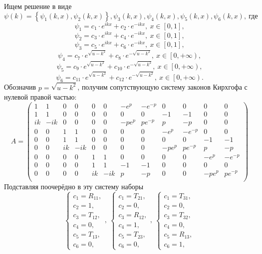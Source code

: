 \documentclass[a4 paper, 12 pt]{extarticle}
\begin{document}
   Ищем решение в виде
   \[\psi\left(k\right) = \left\{\psi_1\left(k,x\right), \psi_2\left(k,x\right)\right\}, \psi_3\left(k,x\right),\psi_4\left(k,x\right),\psi_5\left(k,x\right),\psi_6\left(k,x\right),\ \text{где}\]
   \[\psi_1 = c_1 \cdot e^{ikx} + c_2 \cdot e^{-ikx}, \ x \in \left[0,1\right],\]
   \[\psi_2 = c_3 \cdot e^{ikx} + c_4 \cdot e^{-ikx}, \ x \in \left[0,1\right],\]
   \[\psi_3 = c_5 \cdot e^{ikx} + c_6 \cdot e^{-ikx}, \ x \in \left[0,1\right],\]
   \[\psi_4 = c_7 \cdot e^{\sqrt{u-k^2}} + c_8 \cdot e^{-\sqrt{u-k^2}}, \ x \in \left[0, +\infty\right),\]
   \[\psi_5 = c_9 \cdot e^{\sqrt{u-k^2}} + c_{10} \cdot e^{-\sqrt{u-k^2}}, \ x \in \left[0, +\infty\right),\]
   \[\psi_6 = c_{11} \cdot e^{\sqrt{u-k^2}} + c_{12} \cdot e^{-\sqrt{u-k^2}}, \ x \in \left[0, +\infty\right).\]
   Обозначив $p = \sqrt{u-k^2}$, получим сопутствующую систему законов Кирхгофа с нулевой правой частью:
   \[ A = \left(\begin{smallmatrix}
   1 & 1 & 0 & 0 & 0 & 0 & -e^{p} & -e^{-p} & 0 & 0 & 0 & 0 \\
   1 & 1 & 0 & 0 & 0 & 0 & 0 & 0 & -1 & -1 & 0 & 0 \\
   ik & -ik & 0 & 0 & 0 & 0 & -pe^{p} & pe^{-p} & p & -p & 0 & 0\\
   0 & 0 & 1 & 1 & 0 & 0 & 0 & 0 & -e^{p} & -e^{-p} & 0 & 0 \\
   0 & 0 & 1 & 1 & 0 & 0 & 0 & 0 & 0 & 0 & -1 & -1 \\
   0 & 0 & ik & -ik & 0 & 0 & 0 & 0 & -pe^{p} & pe^{-p} & p & -p \\
   0 & 0 & 0 & 0 & 1 & 1 & 0 & 0 & 0 & 0 & -e^{p} & -e^{-p} \\
   0 & 0 & 0 & 0 & 1 & 1 & -1 & -1 & 0 & 0 & 0 & 0 \\
   0 & 0 & 0 & 0 & ik & -ik & p & -p & 0 & 0 & -pe^{p} & pe^{-p} \\
   \end{smallmatrix}\right)\]
   Подставляя поочерёдно в эту систему наборы 
   \[
   \begin{cases}
   c_1 = R_{11},\\
   c_2 = 1, \\
   c_3 = T_{12}, \\
   c_4 = 0, \\
   c_5 = T_{13}, \\
   c_6 = 0,
   \end{cases}, \ 
   \begin{cases}
   c_1 = T_{21},\\
   c_2 = 0, \\
   c_3 = R_{12}, \\
   c_4 = 1, \\
   c_5 = T_{23}, \\
   c_6 = 0,
   \end{cases}, \
   \begin{cases}
   c_1 = T_{31},\\
   c_2 = 0, \\
   c_3 = T_{32}, \\
   c_4 = 0, \\
   c_5 = R_{13}, \\
   c_6 = 1,
   \end{cases}
   \]
\end{document}
